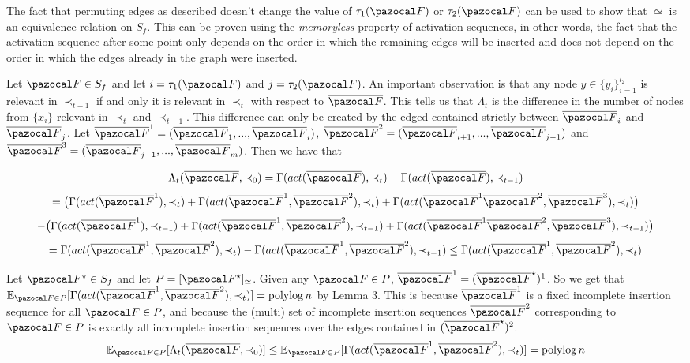 \documentclass{report}
\DeclareMathOperator*{\polylog}{polylog}
\begin{document}
The fact that permuting edges as described doesn't change the value of $\tau_1(\pazocal F)$ or $\tau_2(\pazocal F)$ can be used to show that $\simeq$ is an equivalence relation on $S_f$. This can be proven using the \textit{memoryless} property of activation sequences, in other words, the fact that the activation sequence after some point only depends on the order in which the remaining edges will be inserted and does not depend on the order in which the edges already in the graph were inserted.

Let $\pazocal F \in S_f$ and let $i=\tau_1(\pazocal F)$ and $j=\tau_2(\pazocal F)$. An important observation is that any node $y \in \{y_i\}_{i=1}^{l_2}$ is relevant in $\prec_{t-1}$ if and only it is relevant in $\prec_t$ with respect to $\overline{\pazocal F}$. This tells us that $\Lambda_t$ is the difference in the number of nodes from $\{x_i\}$ relevant in $\prec_t$ and $\prec_{t-1}$. This difference can only be created by the edged contained strictly between $\overline{\pazocal F}_i$ and $\overline{\pazocal F}_j$. Let $\overline{\pazocal F}^1 = (\overline{\pazocal F}_1,...,\overline{\pazocal F}_i)$, $\overline{\pazocal F}^2 = (\overline{\pazocal F}_{i+1},...,\overline{\pazocal F}_{j-1})$ and $\overline{\pazocal F}^3 = (\overline{\pazocal F}_{j+1},...,\overline{\pazocal F}_m)$. Then we have that

\[ \Lambda_t(\overline{\pazocal F}, \prec_0) = \Gamma(act(\overline{\pazocal F}), \prec_{t}) - \Gamma(act(\overline{\pazocal F}), \prec_{t-1}) \]
\[ =\big(\Gamma(act(\overline{\pazocal F}^1), \prec_{t}) + \Gamma(act(\overline{\pazocal F}^1, \overline{\pazocal F}^2), \prec_{t}) + \Gamma(act(\overline{\pazocal F}^1\overline{\pazocal F}^2, \overline{\pazocal F}^3), \prec_{t}) \big) \]
\[ - \big(\Gamma(act(\overline{\pazocal F}^1), \prec_{t-1}) + \Gamma(act(\overline{\pazocal F}^1, \overline{\pazocal F}^2), \prec_{t-1}) + \Gamma(act(\overline{\pazocal F}^1\overline{\pazocal F}^2, \overline{\pazocal F}^3), \prec_{t-1}) \big)\]
\[ = \Gamma(act(\overline{\pazocal F}^1, \overline{\pazocal F}^2), \prec_{t}) - \Gamma(act(\overline{\pazocal F}^1, \overline{\pazocal F}^2), \prec_{t-1}) \leq \Gamma(act(\overline{\pazocal F}^1, \overline{\pazocal F}^2), \prec_{t}) \]

Let $\pazocal F^\star \in S_f$ and let $P=[\pazocal F^\star]_{\simeq}$. Given any $\pazocal F \in P$, $\overline{\pazocal F}^1 = (\overline{\pazocal F}^\star)^1$. So we get that $ \mathbb E_{\pazocal F \in P} [\Gamma(act(\overline{\pazocal F}^1, \overline{\pazocal F}^2), \prec_{t})] = \polylog n$ by Lemma 3. This is because $\overline{\pazocal F}^1$ is a fixed incomplete insertion sequence for all $\pazocal F \in P$, and because the (multi) set of incomplete insertion sequences $\overline{\pazocal F}^2$ corresponding to $\pazocal F \in P$ is exactly all incomplete insertion sequences over the edges contained in $(\overline{\pazocal F}^\star)^2$.
\[ \mathbb E_{\pazocal F \in P} [\Lambda_t(\overline{\pazocal F}, \prec_0)] \leq \mathbb E_{\pazocal F \in P} [\Gamma(act(\overline{\pazocal F}^1, \overline{\pazocal F}^2), \prec_{t})] = \polylog n \]
\end{document}
